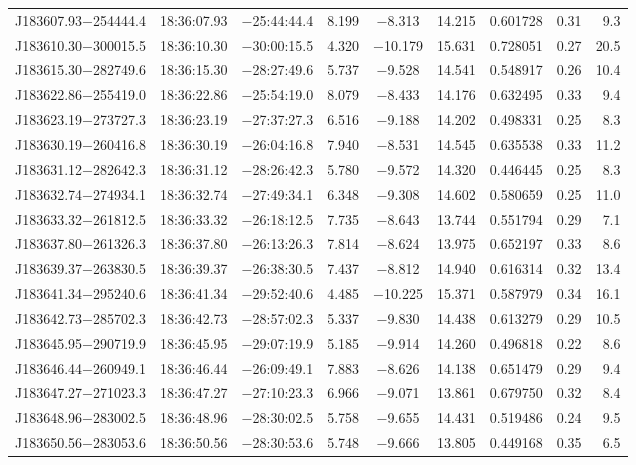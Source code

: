 \begin{table*}
\begin{tabular}{lcccccccr}
J183607.93$-$254444.4 & 18:36:07.93 & $-$25:44:44.4 &  8.199 & $-$8.313 & 14.215 & 0.601728 & 0.31 & 9.3 \\
J183610.30$-$300015.5 & 18:36:10.30 & $-$30:00:15.5 &  4.320 & $-$10.179 & 15.631 & 0.728051 & 0.27 & 20.5 \\
J183615.30$-$282749.6 & 18:36:15.30 & $-$28:27:49.6 &  5.737 & $-$9.528 & 14.541 & 0.548917 & 0.26 & 10.4 \\
J183622.86$-$255419.0 & 18:36:22.86 & $-$25:54:19.0 &  8.079 & $-$8.433 & 14.176 & 0.632495 & 0.33 & 9.4 \\
J183623.19$-$273727.3 & 18:36:23.19 & $-$27:37:27.3 &  6.516 & $-$9.188 & 14.202 & 0.498331 & 0.25 & 8.3 \\
J183630.19$-$260416.8 & 18:36:30.19 & $-$26:04:16.8 &  7.940 & $-$8.531 & 14.545 & 0.635538 & 0.33 & 11.2 \\
J183631.12$-$282642.3 & 18:36:31.12 & $-$28:26:42.3 &  5.780 & $-$9.572 & 14.320 & 0.446445 & 0.25 & 8.3 \\
J183632.74$-$274934.1 & 18:36:32.74 & $-$27:49:34.1 &  6.348 & $-$9.308 & 14.602 & 0.580659 & 0.25 & 11.0 \\
J183633.32$-$261812.5 & 18:36:33.32 & $-$26:18:12.5 &  7.735 & $-$8.643 & 13.744 & 0.551794 & 0.29 & 7.1 \\
J183637.80$-$261326.3 & 18:36:37.80 & $-$26:13:26.3 &  7.814 & $-$8.624 & 13.975 & 0.652197 & 0.33 & 8.6 \\
J183639.37$-$263830.5 & 18:36:39.37 & $-$26:38:30.5 &  7.437 & $-$8.812 & 14.940 & 0.616314 & 0.32 & 13.4 \\
J183641.34$-$295240.6 & 18:36:41.34 & $-$29:52:40.6 &  4.485 & $-$10.225 & 15.371 & 0.587979 & 0.34 & 16.1 \\
J183642.73$-$285702.3 & 18:36:42.73 & $-$28:57:02.3 &  5.337 & $-$9.830 & 14.438 & 0.613279 & 0.29 & 10.5 \\
J183645.95$-$290719.9 & 18:36:45.95 & $-$29:07:19.9 &  5.185 & $-$9.914 & 14.260 & 0.496818 & 0.22 & 8.6 \\
J183646.44$-$260949.1 & 18:36:46.44 & $-$26:09:49.1 &  7.883 & $-$8.626 & 14.138 & 0.651479 & 0.29 & 9.4 \\
J183647.27$-$271023.3 & 18:36:47.27 & $-$27:10:23.3 &  6.966 & $-$9.071 & 13.861 & 0.679750 & 0.32 & 8.4 \\
J183648.96$-$283002.5 & 18:36:48.96 & $-$28:30:02.5 &  5.758 & $-$9.655 & 14.431 & 0.519486 & 0.24 & 9.5 \\
J183650.56$-$283053.6 & 18:36:50.56 & $-$28:30:53.6 &  5.748 & $-$9.666 & 13.805 & 0.449168 & 0.35 & 6.5 \\

\end{tabular}
\end{table*}
